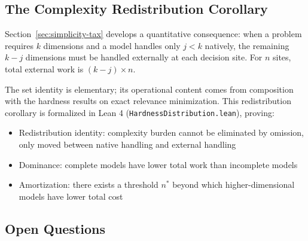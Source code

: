 \subsection*{The Complexity Redistribution Corollary}

Section~\ref{sec:simplicity-tax} develops a quantitative consequence: when a problem requires $k$ dimensions and a model handles only $j < k$ natively, the remaining $k - j$ dimensions must be handled externally at each decision site. For $n$ sites, total external work is $(k-j) \times n$.

The set identity is elementary; its operational content comes from composition with the hardness results on exact relevance minimization. This redistribution corollary is formalized in Lean 4 (\texttt{HardnessDistribution.lean}), proving:
\begin{itemize}
\item Redistribution identity: complexity burden cannot be eliminated by omission, only moved between native handling and external handling
\item Dominance: complete models have lower total work than incomplete models
\item Amortization: there exists a threshold $n^*$ beyond which higher-dimensional models have lower total cost
\end{itemize}

\subsection*{Open Questions}

